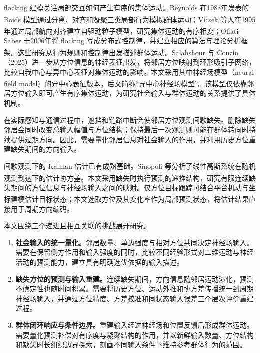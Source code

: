 \documentclass[UTF8,fontset=windows,11pt]{ctexart}
\newcommand{\upcite}[1]{\textsuperscript{\cite{#1}}}
\begin{document}
flocking 建模关注局部交互如何产生有序的集体运动。Reynolds 在1987年发表的 Boids 模型通过分离、对齐和凝聚三类局部行为模拟群体运动\upcite{Reynolds1987}；Vicsek 等人在1995年通过局部航向对齐建立自驱动粒子模型，研究集体运动的有序相变\upcite{Vicsek1995}；Olfati--Saber 于2006年将 flocking 写成分布式控制律，并建立相应的算法与理论分析框架\upcite{OlfatiSaber2006}。这些研究从行为规则和控制律出发描述群体运动。Salahshour 与 Couzin（2025）进一步从方位信息的神经表征出发，将邻居方位映射到环形吸引子网络，比较自我中心与异中心表征对集体运动的影响。本文采用其中神经场模型（neural field model）的异中心表征版本，后文简称“异中心神经场模型”\upcite{Salahshour2025}。该模型仅依靠邻居方位输入即可产生有序集体运动，为研究社会输入与群体运动的关系提供了具体机制。

在实际感知与通信过程中，遮挡和链路中断会使邻居方位观测间歇缺失。删除缺失邻居会同时改变总输入幅值与方位结构；保持最后一次观测则可能在群体转向时持续提供过期方向。因此，需要量化邻居信息对社会输入的作用，并利用历史方位重建缺失期间的方向输入。

间歇观测下的 Kalman 估计已有成熟基础。Sinopoli 等分析了线性高斯系统在随机观测到达下的估计协方差\upcite{Sinopoli2004}。本文采用缺失时执行预测的递推结构，研究有限连续缺失期间的方位信息与神经场输入之间的映射。仅方位目标跟踪可结合平台机动与坐标建模估计目标状态\upcite{Xiourouppa2025}；本文选取方位及其变化率作为局部预测状态，将估计结果直接用于周期方向编码。

本文围绕三个递进且相互关联的挑战展开研究。
\begin{enumerate}[label=\textbf{挑战\arabic*：},leftmargin=5em]
\item \textbf{社会输入的统一量化。}邻居数量、单边强度与相对方位共同决定神经场输入。需要在保留侧方作用和输入强度的同时，比较不同经验形式对二维运动与神经活动的预测能力，建立具有明确选优依据的输入描述。
\item \textbf{缺失方位的预测与输入重建。}连续缺失期间，方向信息随邻居运动演化，预测不确定性也随时间积累。需要将历史方位、运动外推和协方差传播统一到周期神经场输入，并通过方位精度、方差校准和同状态输入误差三个层次评价重建过程。
\item \textbf{群体闭环响应与条件边界。}重建输入经过神经场和位置反馈后形成群体运动。需要量化预测补偿对有序度与凝聚结构的作用，并以新鲜输入数量、方位结构和缺失时长组织边界探索，刻画不同输入条件下维持参考群体行为的范围。
\end{enumerate}
\end{document}

